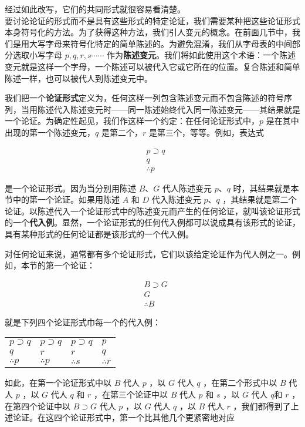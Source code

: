 经过如此改写，它们的共同形式就很容易看清楚。\\
要讨论论证的形式而不是具有这些形式的特定论证，我们需要某种把这些论证形式本身符号化的方法。为了获得这种方法，我们引人变元的概念。在前面几节中，我们是用大写字母来符号化特定的简单陈述的。为避免混淆，我们从字母表的中间部分选取小写字母 $p, q, r, s \cdots \cdots$ 作为\textbf{陈述变元}。我们将如此使用这个术语：一个陈述变元就是这样一个字母，一个陈述可以被代入它或它所在的位置。复合陈述和简单陈述一样，也可以被代人到陈述变元中。

我们把一个\textbf{论证形式}定义为，任何这样一列包含陈述变元而不包含陈述的符号序列，当用陈述代入陈述变元时——同一陈述始终代入同一陈述变元——其结果就是一个论证。为确定性起见，我们作这样一个约定：在任何论证形式中，$p$ 是在其中出现的第一个陈述变元，$q$ 是第二个，$r$ 是第三个，等等。例如，表达式

$$
\begin{aligned}
& p \supset q \\
& q \\
& \therefore p
\end{aligned}
$$

是一个论证形式。因为当分别用陈述 $B 、 G$ 代人陈述变元 $p 、 q$ 时，其结果就是本节中的第一个论证。如果用陈述 $A$ 和 $D$ 代入陈述变元 $p 、 q$ ，其结果就是第二个论证。以陈述代入一个论证形式中的陈述变元而产生的任何论证，就叫该论证形式的一个\textbf{代入例}。显然，一个论证形式的任何代入例都可以说成具有该形式的论证，具有某种形式的任何论证都是该形式的一个代入例。

对任何论证来说，通常都有多个论证形式，它们以该给定论证作为代人例之一。例如，本节的第一个论证：

$$
\begin{aligned}
& B \supset G \\
& G \\
& \therefore B
\end{aligned}
$$

就是下列四个论证形式巾每一个的代入例：

\begin{center}
\begin{tabular}{llll}
$p \supset q$ & $p \supset q$ & $p \supset q$ & $p$ \\
$q$ & $r$ & $r$ & $q$ \\
$\therefore p$ & $\therefore p$ & $\therefore s$ & $\therefore r$ \\
\end{tabular}
\end{center}

如此，在第一个论证形式中以 $B$ 代人 $p$ ，以 $G$ 代人 $q$ ，在第二个形式中以 $B$ 代人 $p$ ，以 $G$ 代人 $q$ 和 $r$ ，在第三个论证中以 $B$ 代人 $p$ 和 $s$ ，以 $G$ 代人 $q$和 $r$ ，在第四个论证中以 $B \supset G$ 代人 $p$ ，以 $G$ 代人 $q$ ，以 $B$ 代人 $r$ ，我们都得到了上述论证。在这四个论证形式中，第一个比其他几个更紧密地对应

